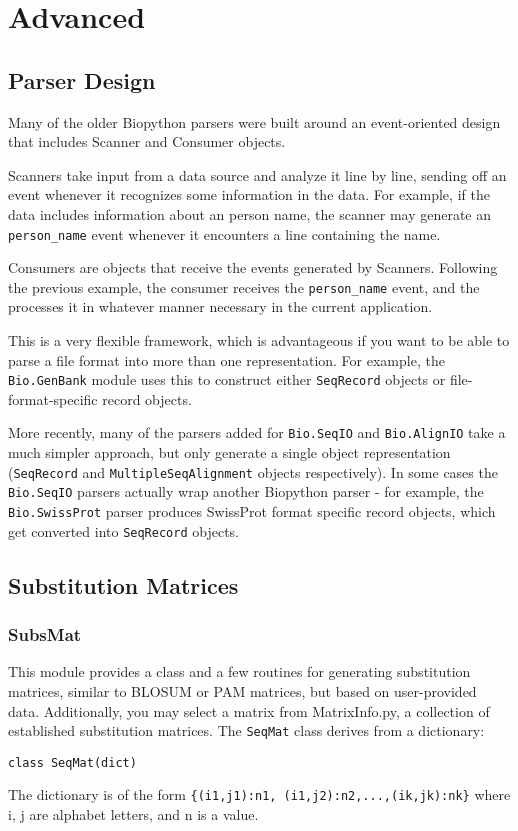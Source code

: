 \chapter{Advanced}
\label{chapter:advanced}

\section{Parser Design}

Many of the older Biopython parsers were built around an event-oriented
design that includes Scanner and Consumer objects.

Scanners take input from a data source and analyze it line by line,
sending off an event whenever it recognizes some information in the
data.  For example, if the data includes information about an person
name, the scanner may generate an \verb|person_name| event whenever it
encounters a line containing the name.

Consumers are objects that receive the events generated by Scanners.
Following the previous example, the consumer receives the
\verb|person_name| event, and the processes it in whatever manner
necessary in the current application.

This is a very flexible framework, which is advantageous if you want to
be able to parse a file format into more than one representation.  For
example, the \verb|Bio.GenBank| module uses this to construct either
\verb|SeqRecord| objects or file-format-specific record objects.

More recently, many of the parsers added for \verb|Bio.SeqIO| and
\verb|Bio.AlignIO| take a much simpler approach, but only generate a
single object representation (\verb|SeqRecord| and
\verb|MultipleSeqAlignment| objects respectively). In some cases the
\verb|Bio.SeqIO| parsers actually wrap
another Biopython parser - for example, the \verb|Bio.SwissProt| parser
produces SwissProt format specific record objects, which get converted
into \verb|SeqRecord| objects.

\section{Substitution Matrices}

\subsection{SubsMat}

This module provides a class and a few routines for generating substitution matrices, similar to BLOSUM or PAM matrices, but based on user-provided data. Additionally, you may select a matrix from MatrixInfo.py, a collection of established substitution matrices. The \verb+SeqMat+ class derives from a dictionary:
\begin{verbatim}
class SeqMat(dict)
\end{verbatim}
The dictionary is of the form \verb|{(i1,j1):n1, (i1,j2):n2,...,(ik,jk):nk}| where i, j are alphabet letters, and n is a value.

